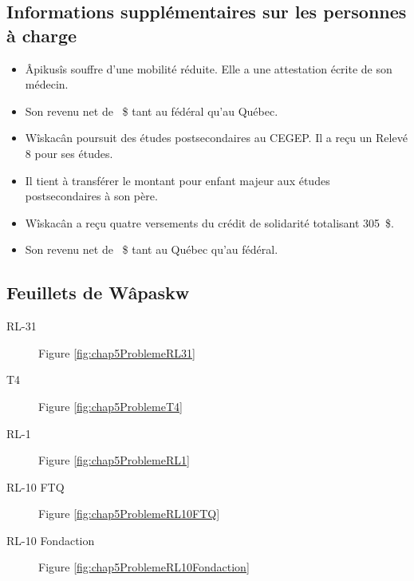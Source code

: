 \subsection{Informations supplémentaires sur les personnes à charge}
\begin{itemize}
	\item Âpikusîs souffre d'une mobilité réduite. Elle a une attestation écrite de son médecin.
	\item Son revenu net de ~\$ tant au fédéral qu'au Québec.
	\item Wîskacân poursuit des études postsecondaires au CEGEP. Il a reçu un Relevé 8 pour ses études.
	\item Il tient à transférer le montant pour enfant majeur aux études postsecondaires à son père.
	\item Wîskacân a reçu quatre versements du crédit de solidarité totalisant 305~\$.
	\item Son revenu net de ~\$ tant au Québec qu'au fédéral.
\end{itemize}


\subsection{Feuillets de Wâpaskw}
\begin{description}
	\item[RL-31] Figure \ref{fig:chap5ProblemeRL31}
	\item[T4] Figure \ref{fig:chap5ProblemeT4}
	\item[RL-1] Figure \ref{fig:chap5ProblemeRL1}
	\item[RL-10 FTQ] Figure \ref{fig:chap5ProblemeRL10FTQ}
	\item[RL-10 Fondaction] Figure \ref{fig:chap5ProblemeRL10Fondaction}
\end{description}

